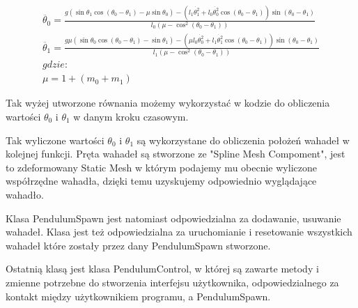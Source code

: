 \documentclass[a4paper,12pt,reqno]{article}
\begin{document}
\begin{equation}
\begin{split} 
\ddot{\theta_0}=\frac{g(\sin\theta_1\cos(\theta_0-\theta_1)-\mu\sin\theta_0)
-(l_1\dot{\theta_1^2}+l_0\dot{\theta_0^2}\cos(\theta_0-\theta_1))\sin(\theta_0-\theta_1)}{l_0(\mu-\cos^2(\theta_0-\theta_1))}
\\
\ddot{\theta_1}=\frac{g\mu(\sin\theta_0\cos(\theta_0-\theta_1)-\sin\theta_1)
-(\mu l_0\dot{\theta_0^2}+l_1\dot{\theta_1^2}\cos(\theta_0-\theta_1))\sin(\theta_0-\theta_1)}
{l_1(\mu-\cos^2(\theta_0-\theta_1))}
\\
gdzie:
\\
\mu=1+(m_0+m_1)
\end{split}
\label{computeAngularAcceleration}
\end{equation}

Tak wyżej utworzone równania możemy wykorzystać w kodzie do obliczenia wartości $\theta_0$ i $\theta_1$ w danym kroku czasowym.


\label{ComputeTheta}


Tak wyliczone wartości $\theta_0$ i $\theta_1$ są wykorzystane do obliczenia położeń wahadeł w kolejnej funkcji. Pręta wahadeł są stworzone ze "Spline Mesh Compoment", jest to zdeformowany Static Mesh w którym podajemy mu obecnie wyliczone współrzędne wahadła, dzięki temu uzyskujemy odpowiednio wyglądające wahadło.




Klasa PendulumSpawn jest natomiast odpowiedzialna za dodawanie, usuwanie wahadeł. Klasa jest też odpowiedzialna za uruchomianie i resetowanie wszystkich wahadeł które zostały przez dany PendulumSpawn stworzone.

Ostatnią klasą jest klasa PendulumControl, w której są zawarte metody i zmienne potrzebne do stworzenia interfejsu użytkownika, odpowiedzialnego za kontakt między użytkownikiem programu, a PendulumSpawn.
\end{document}

